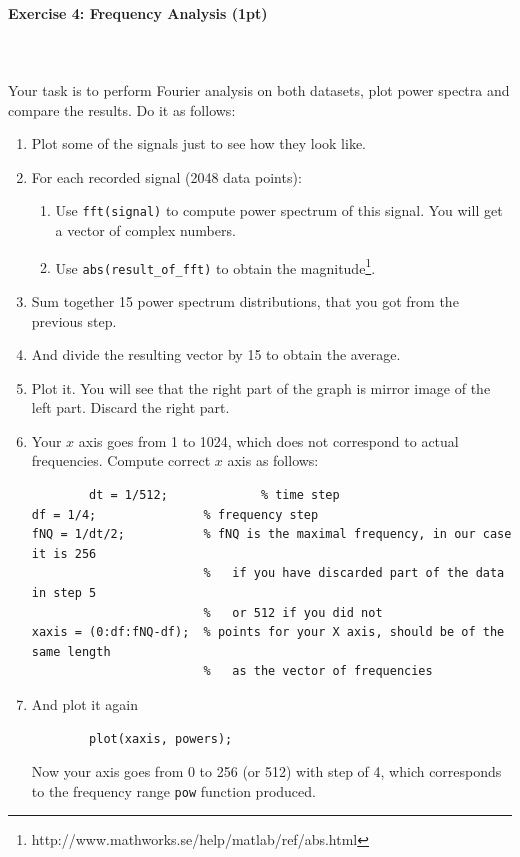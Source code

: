 \documentclass[a4paper,11pt]{article}
\newenvironment{exercise}[3]{\paragraph{Exercise #1: #2 (#3pt)}\ \\}{
\medskip}
\begin{document}
\begin{exercise}{4}{Frequency Analysis}{1}
\ \\
Your task is to perform Fourier analysis on both datasets, plot power spectra and compare the results. Do it as follows:
\begin{enumerate}
	\item Plot some of the signals just to see how they look like.
	\item For each recorded signal (2048 data points):
		\begin{enumerate}
			\item Use \texttt{fft(signal)} to compute power spectrum of this signal. You will get a vector of complex numbers.
			\item Use \texttt{abs(result\_of\_fft)} to obtain the magnitude\footnote{http://www.mathworks.se/help/matlab/ref/abs.html}.
		\end{enumerate}
	\item Sum together 15 power spectrum distributions, that you got from the previous step.
	\item And divide the resulting vector by 15 to obtain the average.
	\item Plot it. You will see that the right part of the graph is mirror image of the left part. Discard the right part.
	\item Your $x$ axis goes from 1 to 1024, which does not correspond to actual frequencies. Compute correct $x$ axis as follows:
		\begin{verbatim}
		dt = 1/512;             % time step
df = 1/4;               % frequency step
fNQ = 1/dt/2;           % fNQ is the maximal frequency, in our case it is 256
                        %   if you have discarded part of the data in step 5 
                        %   or 512 if you did not
xaxis = (0:df:fNQ-df);  % points for your X axis, should be of the same length 
                        %   as the vector of frequencies
		\end{verbatim}
	\item And plot it again
		\begin{verbatim}
		plot(xaxis, powers);
		\end{verbatim}
		Now your axis goes from 0 to 256 (or 512) with step of 4, which corresponds to the frequency range \texttt{pow} function produced.
\end{enumerate}


\end{exercise}
\end{document}

